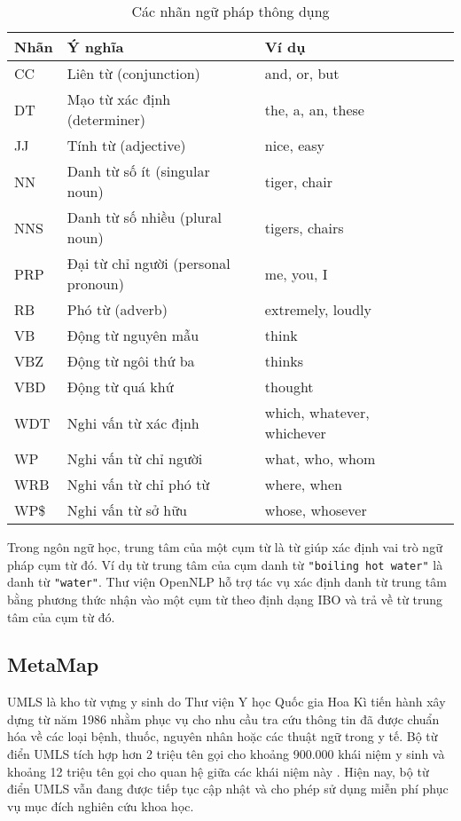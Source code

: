 \begin{table}[ht]
\centering{}
\caption{Các nhãn ngữ pháp thông dụng \label{tab:POSTag}}
\footnotesize\sffamily

\begin{tabularx}{0.8\textwidth}{@{}l *5{>{\arraybackslash}X}@{}}
\toprule 
\textbf{Nhãn} & \textbf{Ý nghĩa} & \textbf{Ví dụ}\\
\midrule
CC & Liên từ (conjunction) & and, or, but\\
DT & Mạo từ xác định (determiner) & the, a, an, these\\
JJ & Tính từ (adjective) & nice, easy \\
NN & Danh từ số ít (singular noun) & tiger, chair \\
NNS & Danh từ số nhiều (plural noun) & tigers, chairs \\
PRP & Đại từ chỉ người (personal pronoun) & me, you, I \\
RB & Phó từ (adverb) & extremely, loudly \\
VB & Động từ nguyên mẫu & think  \\
VBZ & Động từ ngôi thứ ba & thinks \\
VBD & Động từ quá khứ & thought \\
WDT & Nghi vấn từ xác định & which, whatever, whichever\\
WP & Nghi vấn từ chỉ người & what, who, whom \\
WRB & Nghi vấn từ chỉ phó từ & where, when \\
WP\$ & Nghi vấn từ sở hữu & whose, whosever \\
\bottomrule
\end{tabularx}
\end{table}

Trong ngôn ngữ học, trung tâm của một cụm từ là từ giúp xác định vai trò ngữ pháp cụm từ đó. Ví dụ từ trung tâm của cụm danh từ \texttt{"boiling hot water"} là danh từ \texttt{"water"}. Thư viện OpenNLP hỗ trợ tác vụ xác định danh từ trung tâm bằng phương thức nhận vào một cụm từ theo định dạng IBO và trả về từ trung tâm của cụm từ đó.

\subsection*{MetaMap}
UMLS là kho từ vựng y sinh do Thư viện Y học Quốc gia Hoa Kì tiến hành xây dựng từ năm 1986 nhằm phục vụ cho nhu cầu tra cứu thông tin đã được chuẩn hóa về các loại bệnh, thuốc, nguyên nhân hoặc các thuật ngữ trong y tế. Bộ từ điển UMLS tích hợp hơn 2 triệu tên gọi cho khoảng 900.000 khái niệm y sinh và khoảng 12 triệu tên gọi cho quan hệ giữa các khái niệm này \cite{Olivier2004}. Hiện nay, bộ từ điển UMLS vẫn đang được tiếp tục cập nhật và cho phép sử dụng miễn phí phục vụ mục đích nghiên cứu khoa học.

